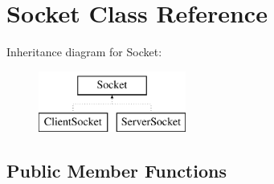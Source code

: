 \hypertarget{class_socket}{\section{Socket Class Reference}
\label{class_socket}
}
Inheritance diagram for Socket\-:\begin{figure}[H]
\begin{center}
\leavevmode
\includegraphics[height=2.000000cm]{class_socket}
\end{center}
\end{figure}
\subsection*{Public Member Functions}
